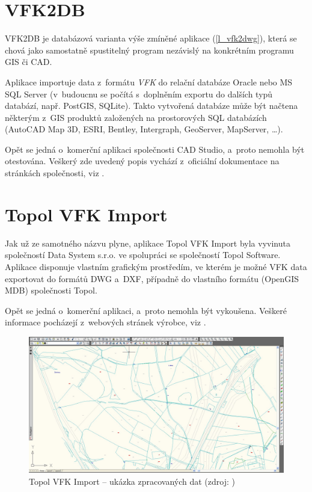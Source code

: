 \documentclass[a4paper,12pt,oneside]{book}
\begin{document}
\section{VFK2DB}
VFK2DB je databázová varianta výše zmíněné aplikace (\ref{l_vfk2dwg}),
která se chová jako samostatně spustitelný program nezávislý na
konkrétním programu GIS či CAD.

Aplikace importuje data z~formátu \textit{VFK} do relační databáze
Oracle nebo MS SQL Server (v~budoucnu se počítá s~doplněním exportu do
dalších typů databází, např. PostGIS, SQLite). Takto vytvořená
databáze může být načtena některým z~GIS produktů založených na
prostorových SQL databázích (AutoCAD Map 3D, ESRI, Bentley,
Intergraph, GeoServer, MapServer, \dots).

Opět se jedná o~komerční aplikaci společnosti CAD Studio, a~proto
nemohla být otestována. Veškerý zde uvedený popis vychází z~oficiální
dokumentace na stránkách společnosti, viz \cite{cadstudio-vfk2db}.

\section{Topol VFK Import}
Jak už ze samotného názvu plyne, aplikace Topol VFK Import byla
vyvinuta společností Data System s.r.o. ve spolupráci se společností
Topol Software. Aplikace disponuje vlastním grafickým prostředím, ve
kterém je možné VFK data exportovat do formátů DWG a~DXF, případně do
vlastního formátu (OpenGIS MDB) společnosti Topol.

Opět se jedná o~komerční aplikaci, a~proto nemohla být
vykoušena. Veškeré informace pocházejí z~webových stránek výrobce, viz
\cite{topol_vfk_import}.

\begin{figure}[htb]
\centering
\includegraphics[width=\textwidth]{images/topol-aplikace.png}
\caption[Topol VFK Import -- ukázka zpracovaných dat]{Topol VFK Import -- ukázka zpracovaných dat (zdroj: \cite{topol_vfk_import})}
\end{figure}
\end{document}

